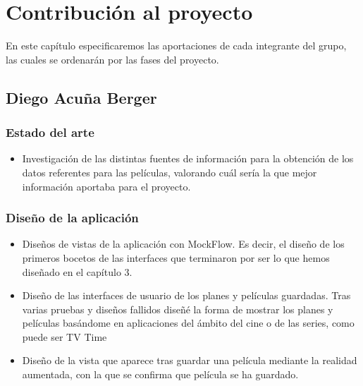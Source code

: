 
\cleardoublepage


\chapter{Contribución al proyecto}
\label{makereference7}
En este capítulo especificaremos las aportaciones de cada integrante del grupo,
 las cuales se ordenarán por las fases del proyecto.

\section{Diego Acuña Berger}
\label{makereference7.1}
    \subsection{Estado del arte}
    \label{makereference7.1.1}
        \begin{itemize}
            \item Investigación de las distintas fuentes de información para la obtención de los datos referentes para las películas, valorando cuál sería la que mejor información aportaba para el proyecto.
        \end{itemize}
    \subsection{Diseño de la aplicación}
    \label{makereference7.1.2}
        \begin{itemize}
            \item Diseños de vistas de la aplicación con MockFlow. Es decir, el diseño de los primeros bocetos de las interfaces que terminaron por ser lo que hemos diseñado en el capítulo 3.
            \item Diseño de las interfaces de usuario de los planes y películas
            guardadas. Tras varias pruebas y diseños fallidos diseñé la forma de mostrar los planes y películas basándome en aplicaciones del ámbito del cine o de las series, como puede ser TV Time \cite{tvtime}
            \item Diseño de la vista que aparece tras guardar una película mediante la realidad aumentada, con la que se confirma que película se ha guardado.
        \end{itemize}
